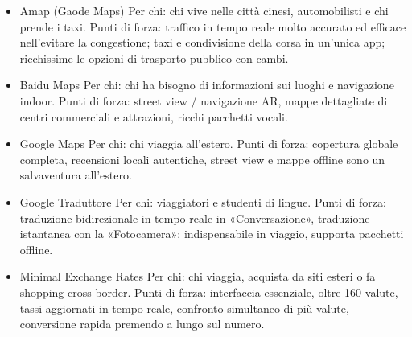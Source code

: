 \begin{itemize}
  \item Amap (Gaode Maps) Per chi: chi vive nelle città cinesi, automobilisti e chi prende i taxi. Punti di forza: traffico in tempo reale molto accurato ed efficace nell'evitare la congestione; taxi e condivisione della corsa in un'unica app; ricchissime le opzioni di trasporto pubblico con cambi.
  \item Baidu Maps Per chi: chi ha bisogno di informazioni sui luoghi e navigazione indoor. Punti di forza: street view / navigazione AR, mappe dettagliate di centri commerciali e attrazioni, ricchi pacchetti vocali.
  \item Google Maps Per chi: chi viaggia all'estero. Punti di forza: copertura globale completa, recensioni locali autentiche, street view e mappe offline sono un salvaventura all'estero.
\end{itemize}


\begin{itemize}
  \item Google Traduttore Per chi: viaggiatori e studenti di lingue. Punti di forza: traduzione bidirezionale in tempo reale in «Conversazione», traduzione istantanea con la «Fotocamera»; indispensabile in viaggio, supporta pacchetti offline.
\end{itemize}


\begin{itemize}
  \item Minimal Exchange Rates Per chi: chi viaggia, acquista da siti esteri o fa shopping cross-border. Punti di forza: interfaccia essenziale, oltre 160 valute, tassi aggiornati in tempo reale, confronto simultaneo di più valute, conversione rapida premendo a lungo sul numero.
\end{itemize}


